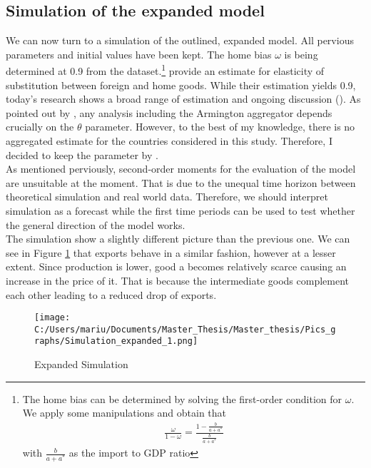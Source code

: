 \documentclass{article}
\begin{document}
\subsection{Simulation of the expanded model}

We can now turn to a simulation of the outlined, expanded model. All pervious parameters and initial values have been kept. The home bias $\omega$ is being determined at 0.9 from the dataset.\footnote{The home bias can be determined by solving the first-order condition for $\omega$. We apply some manipulations and obtain that \begin{align}
\frac{\omega}{1-\omega} = \frac{1 - \frac{b}{a + a^*}}{\frac{b}{a + a^*}}
\end{align}
with $\frac{b}{a + a^*}$ as the import to GDP ratio}
\cite{heathcote2002financial} provide an estimate for elasticity of substitution between foreign and home goods. While their estimation yields 0.9, today's research shows a broad range of estimation and ongoing discussion (\cite{feenstra2018search}). As pointed out by \cite{feenstra2018search}, any analysis including the Armington aggregator depends crucially on the $\theta$ parameter. However, to the best of my knowledge, there is no aggregated estimate for the countries considered in this study. Therefore, I decided to keep the parameter by  
\cite{heathcote2002financial}.\\
As mentioned perviously, second-order moments for the evaluation of the model are unsuitable at the moment. That is due to the unequal time horizon between theoretical simulation and real world data. Therefore, we should interpret simulation as a forecast while the first time periods can be used to test whether the general direction of the model works. \\
The simulation show a slightly different picture than the previous one. We can see in Figure \ref{Expanded Simulation} that exports behave in a similar fashion, however at a lesser extent. Since production is lower, good a becomes relatively scarce causing an increase in the price of it. That is because the intermediate goods complement each other leading to a reduced drop of exports.
\begin{figure}[!ht]
\begin{center}\caption{Expanded Simulation \label{Expanded Simulation}}
\texttt{[image: C:/Users/mariu/Documents/Master\_Thesis/Master\_thesis/Pics\_graphs/Simulation\_expanded\_1.png]}\\
\end{center}
\end{figure}
\end{document}
